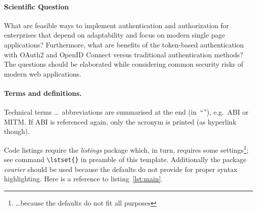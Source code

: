 \paragraph{Scientific Question}
What are feasible ways to implement authentication and authorization for enterprises that depend on adaptability and focus on modern single page applications? Furthermore, what are benefits of the token-based authentication with OAuth2 and OpenID Connect versus traditional authentication methods? The questions should be elaborated while considering common security risks of modern web applications.


\paragraph{Terms and definitions.}
Technical terms \ldots\ abbreviations are summarised at the end (in~``''), e.g.\ \ac{ABI} or \ac{MITM}. If \ac{ABI} is referenced again, only the acronym is printed (as hyperlink though).

Code listings require the \textit{listings} package which, in turn, requires some settings\footnote{\ldots because the defaults do not fit all purposes}; see command \verb+\lstset{}+ in preamble of this template. Additionally the package \textit{courier} should be used because the defaults do not provide for proper syntax highlighting. Here is a reference to listing~\ref{lst:main}.


\chapterend
